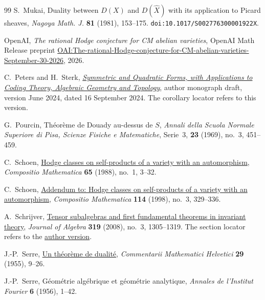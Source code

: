 \documentclass[11pt]{article}
\numberwithin{equation}{section}
\begin{document}
\begin{thebibliography}{99}
S.~Mukai,
Duality between \(D(X)\) and \(D(\widehat X)\) with its application to Picard sheaves,
\emph{Nagoya Math. J.} \textbf{81} (1981), 153--175.
\texttt{doi:10.1017/S002776300001922X}.

OpenAI,
\emph{The rational Hodge conjecture for CM abelian varieties},
OpenAI Math Release preprint
\href{https://github.com/openai/math/blob/main/preprints/The-rational-Hodge-conjecture-for-CM-abelian-varieties-September-30-2026/paper.pdf}{OAI:The-rational-Hodge-conjecture-for-CM-abelian-varieties-September-30-2026},
2026.

C.~Peters and H.~Sterk,
\href{https://www-fourier.univ-grenoble-alpes.fr/~peters/Books/QuadraticForms/QuadForms.pdf}{\emph{Symmetric and Quadratic Forms, with Applications to Coding Theory, Algebraic Geometry and Topology}},
author monograph draft, version June 2024, dated 16 September 2024.
The corollary locator refers to this version.

G.~Pourcin,
Th\'eor\`eme de Douady au-dessus de \(S\),
\emph{Annali della Scuola Normale Superiore di Pisa, Scienze Fisiche e Matematiche},
Serie~3, \textbf{23} (1969), no.~3, 451--459.

C.~Schoen,
\href{https://www.numdam.org/item/CM_1988__65_1_3_0/}{Hodge classes on self-products of a variety with an automorphism},
\emph{Compositio Mathematica} \textbf{65} (1988), no.~1, 3--32.

C.~Schoen,
\href{https://doi.org/10.1023/A:1000566205021}{Addendum to: Hodge classes on self-products of a variety with an automorphism},
\emph{Compositio Mathematica} \textbf{114} (1998), no.~3, 329--336.

A.~Schrijver,
\href{https://doi.org/10.1016/j.jalgebra.2007.10.039}{Tensor subalgebras and first fundamental theorems in invariant theory},
\emph{Journal of Algebra} \textbf{319} (2008), no.~3, 1305--1319.
The section locator refers to the
\href{https://homepages.cwi.nl/~lex/files/tensfft_ja.pdf}{author version}.

J.-P.~Serre,
\href{https://doi.org/10.5169/seals-23275}{Un th\'eor\`eme de dualit\'e},
\emph{Commentarii Mathematici Helvetici}
\textbf{29} (1955), 9--26.

J.-P.~Serre,
G\'eom\'etrie alg\'ebrique et g\'eom\'etrie analytique,
\emph{Annales de l'Institut Fourier} \textbf{6} (1956), 1--42.


\end{thebibliography}
\end{document}
